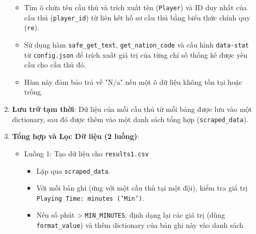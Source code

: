 \documentclass[12pt, a4paper]{report}
\begin{document}
\begin{enumerate}[label=\textbf{Bước \arabic*:}, leftmargin=*]
    \begin{itemize}[leftmargin=0em]
        \item Tìm ô chứa tên cầu thủ và trích xuất tên (\texttt{Player}) và ID duy nhất của cầu thủ (\texttt{player\_id}) từ liên kết hồ sơ cầu thủ bằng biểu thức chính quy (\texttt{re}). 
        \item Sử dụng hàm \texttt{safe\_get\_text}, \texttt{get\_nation\_code} và cấu hình \texttt{data-stat} từ \texttt{config.json} để trích xuất giá trị của từng chỉ số thống kê được yêu cầu cho cầu thủ đó.
        \item Hàm này đảm bảo trả về "N/a" nếu một ô dữ liệu không tồn tại hoặc trống. 
    \end{itemize}
    \item \textbf{Lưu trữ tạm thời}: Dữ liệu của mỗi cầu thủ từ mỗi bảng được lưu vào một dictionary, sau đó được thêm vào một danh sách tổng hợp (\texttt{scraped\_data}). 
    \item \textbf{Tổng hợp và Lọc Dữ liệu (2 luồng)}:
    \begin{itemize}[leftmargin=0em]
        \item Luồng 1: Tạo dữ liệu cho \texttt{results1.csv}
        \begin{itemize}
            \item Lặp qua \texttt{scraped\_data}. 
            \item Với mỗi bản ghi (ứng với một cầu thủ tại một đội), kiểm tra giá trị \texttt{Playing Time: minutes ('Min')}. 
            \item Nếu số phút > \texttt{MIN\_MINUTES}, định dạng lại các giá trị (dùng \texttt{format\_value}) và thêm dictionary của bản ghi này vào danh sách \sloppypar
            

\end{itemize}
\end{itemize}
\end{enumerate}
\end{document}

